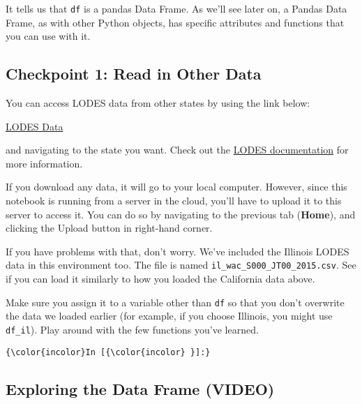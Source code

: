 \documentclass[11pt]{article}
\begin{document}
    It tells us that \texttt{df} is a pandas Data Frame. As we'll see later
on, a Pandas Data Frame, as with other Python objects, has specific
attributes and functions that you can use with it.

    \hypertarget{checkpoint-1-read-in-other-data}{%
\subsection{\texorpdfstring{{Checkpoint 1: Read in Other
Data}}{Checkpoint 1: Read in Other Data}}\label{checkpoint-1-read-in-other-data}}

You can access LODES data from other states by using the link below:

\href{https://lehd.ces.census.gov/data/lodes/LODES7}{LODES Data}

and navigating to the state you want. Check out the
\href{https://lehd.ces.census.gov/data/lodes/LODES7/LODESTechDoc7.3.pdf}{LODES
documentation} for more information.

If you download any data, it will go to your local computer. However,
since this notebook is running from a server in the cloud, you'll have
to upload it to this server to access it. You can do so by navigating to
the previous tab (\textbf{Home}), and clicking the Upload button in
right-hand corner.

If you have problems with that, don't worry. We've included the Illinois
LODES data in this environment too. The file is named
\texttt{il\_wac\_S000\_JT00\_2015.csv}. See if you can load it similarly
to how you loaded the California data above.

Make sure you assign it to a variable other than \texttt{df} so that you
don't overwrite the data we loaded earlier (for example, if you choose
Illinois, you might use \texttt{df\_il}). Play around with the few
functions you've learned.

    \begin{Verbatim}[commandchars=\\\{\}]
{\color{incolor}In [{\color{incolor} }]:} 
\end{Verbatim}


    \hypertarget{exploring-the-data-frame-video}{%
\subsection{\texorpdfstring{{Exploring the Data Frame
(VIDEO)}}{Exploring the Data Frame (VIDEO)}}\label{exploring-the-data-frame-video}}
\end{document}
